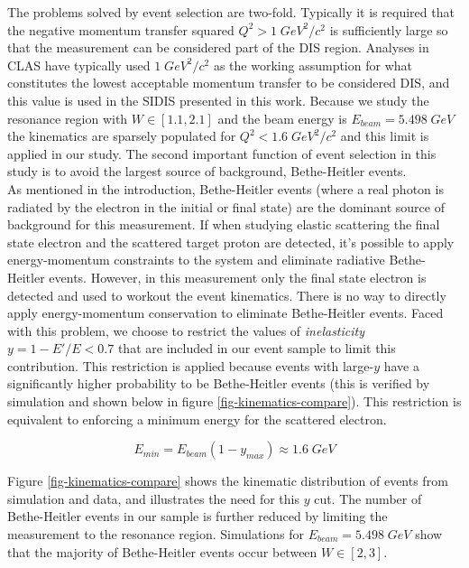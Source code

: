 The problems solved by event selection are two-fold.  Typically it is required that the negative momentum transfer squared $Q^2 > 1 \; GeV^2/c^2$ is sufficiently large so that the measurement can be considered part of the DIS region.  Analyses in CLAS have typically used $1 \; GeV^2/c^2$ as the working assumption for what constitutes the lowest acceptable momentum transfer to be considered DIS, and this value is used in the SIDIS presented in this work.  Because we study the resonance region with $W \in [1.1, 2.1]$ and the beam energy is $E_{beam} = 5.498 \; GeV$ the kinematics are sparsely populated for $Q^2 < 1.6 \; GeV^2/c^2$ and this limit is applied in our study.  The second important function of event selection in this study is to avoid the largest source of background, Bethe-Heitler events. \\

As mentioned in the introduction, Bethe-Heitler events (where a real photon is radiated by the electron in the initial or final state) are the dominant source of background for this measurement.  If when studying elastic scattering the final state electron and the scattered target proton are detected, it's possible to apply energy-momentum constraints to the system and eliminate radiative Bethe-Heitler events.  However, in this measurement only the final state electron is detected and used to workout the event kinematics.  There is no way to directly apply energy-momentum conservation to eliminate Bethe-Heitler events.  Faced with this problem, we choose to restrict the values of \textit{inelasticity} $y = 1-E'/E < 0.7$ that are included in our event sample to limit this contribution.  This restriction is applied because events with large-$y$ have a significantly higher probability to be Bethe-Heitler events (this is verified by simulation and shown below in figure \ref{fig-kinematics-compare}).  This restriction is equivalent to enforcing a minimum energy for the scattered electron.

\begin{equation}
	E_{min} = E_{beam}(1-y_{max}) \approx 1.6 \; GeV  
\end{equation}   

Figure \ref{fig-kinematics-compare} shows the kinematic distribution of events from simulation and data, and illustrates the need for this $y$ cut.  The number of Bethe-Heitler events in our sample is further reduced by limiting the measurement to the resonance region.  Simulations for $E_{beam} = 5.498 \; GeV$ show that the majority of Bethe-Heitler events occur between $W \in [2, 3]$.

